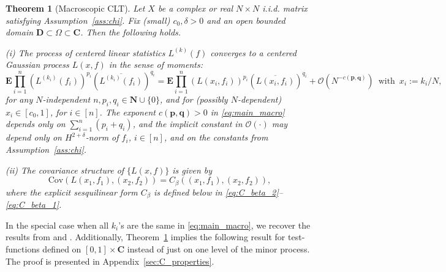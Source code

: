 \documentclass[10pt]{amsart}
\newtheorem{theorem}{Theorem}[section]
\numberwithin{equation}{section}
\newcommand{\E}{\mathbf{E}}
\newcommand{\C}{\mathbf{C}}
\newcommand{\DD}{\mathbf{D}}
\newcommand{\N}{\mathbf{N}}
\newcommand{\Cov}{\mathrm{Cov}}
\begin{document}
\begin{theorem}[Macroscopic CLT]\label{theo:main} Let $X$ be a complex or real $N\times N$ i.i.d. matrix satisfying Assumption~\ref{ass:chi}. Fix (small) $c_0,\delta>0$ and an open bounded domain $\DD\subset \Omega\subset \C$. Then the following holds.

\emph(i) The process of centered linear statistics $L^{(k)}(f)$ converges to a centered Gaussian process $L(x,f)$ in the sense of moments: 
\begin{equation}
\E \prod_{i=1}^n \left(L^{(k_i)}(f_i)\right)^{p_i} \left(\overline{L^{(k_i)}(f_i)}\right)^{q_i} = \E \prod_{i=1}^n \left(L(x_i,f_i)\right)^{p_i}\left(\overline{L(x_i,f_i)}\right)^{q_i} + \mathcal{O}(N^{-c(\bm{p},\bm{q})})\,\,\,\text{with}\,\,\, x_i:=k_i/N,
\label{eq:main_macro}
\end{equation}
for any $N$-independent $n, p_i,q_i\in\N\cup\{0\}$, and for (possibly $N$-dependent) $x_i\in [c_0,1]$, for $i\in [n]$. The exponent $c(\bm{p},\bm{q})>0$ in \eqref{eq:main_macro} depends only on $\sum_{i=1}^n (p_i+q_i)$, and the implicit constant in $\mathcal{O}(\cdot)$ may depend only on $H^{2+\delta}$-norm of $f_i$, $i\in[n]$, and on the constants from Assumption~\ref{ass:chi}.

\emph{(ii)} The covariance structure of $\{L(x,f)\}$ is given by
\begin{equation}
\Cov\left(L(x_1,f_1),(x_2,f_2)\right)=C_\beta\left((x_1,f_1),(x_2,f_2)\right),
\label{eq:Cov_L}
\end{equation}
where the explicit sesquilinear form $C_\beta$ is defined below in \eqref{eq:C_beta_2}--\eqref{eq:C_beta_1}.
\end{theorem}

In the special case when all $k_i$'s are the same in \eqref{eq:main_macro}, we recover the results from \cite[Theorem~2.2]{macroCLT_real} and \cite[Theorem~2.2]{macroCLT_complex}. Additionally, Theorem~\ref{theo:main} implies the following result for test-functions defined on $[0,1]\times\C$ instead of just on one level of the minor process. The proof is presented in Appendix~\ref{sec:C_properties}.
\end{document}
